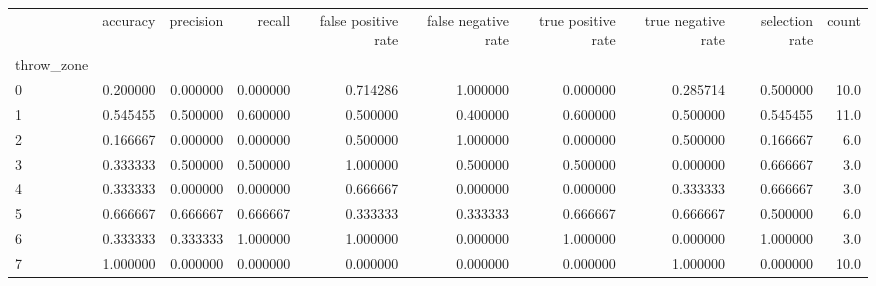\begin{tabular}{lrrrrrrrrr}
\toprule
{} &  accuracy &  precision &    recall &  false positive rate &  false negative rate &  true positive rate &  true negative rate &  selection rate &  count \\
throw\_zone &           &            &           &                      &                      &                     &                     &                 &        \\
\midrule
0          &  0.200000 &   0.000000 &  0.000000 &             0.714286 &             1.000000 &            0.000000 &            0.285714 &        0.500000 &   10.0 \\
1          &  0.545455 &   0.500000 &  0.600000 &             0.500000 &             0.400000 &            0.600000 &            0.500000 &        0.545455 &   11.0 \\
2          &  0.166667 &   0.000000 &  0.000000 &             0.500000 &             1.000000 &            0.000000 &            0.500000 &        0.166667 &    6.0 \\
3          &  0.333333 &   0.500000 &  0.500000 &             1.000000 &             0.500000 &            0.500000 &            0.000000 &        0.666667 &    3.0 \\
4          &  0.333333 &   0.000000 &  0.000000 &             0.666667 &             0.000000 &            0.000000 &            0.333333 &        0.666667 &    3.0 \\
5          &  0.666667 &   0.666667 &  0.666667 &             0.333333 &             0.333333 &            0.666667 &            0.666667 &        0.500000 &    6.0 \\
6          &  0.333333 &   0.333333 &  1.000000 &             1.000000 &             0.000000 &            1.000000 &            0.000000 &        1.000000 &    3.0 \\
7          &  1.000000 &   0.000000 &  0.000000 &             0.000000 &             0.000000 &            0.000000 &            1.000000 &        0.000000 &   10.0 \\
\bottomrule
\end{tabular}
